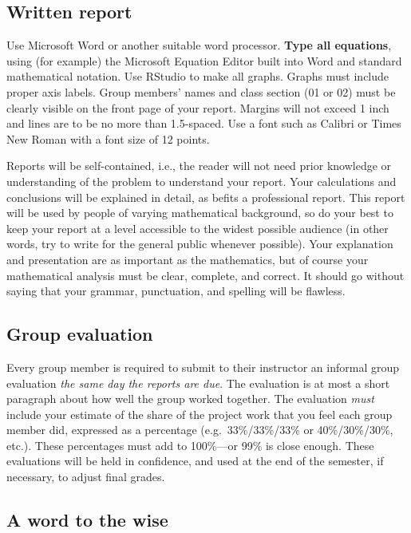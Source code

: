 \documentclass[11pt]{article}
\begin{document}
\subsection*{Written report}
\vspace{-2.8ex}

Use Microsoft Word or another suitable word processor. \textbf{Type all
equations}, using (for example) the Microsoft Equation Editor built into Word
and standard mathematical notation. Use RStudio to make all graphs. Graphs
must include proper axis labels. Group members' names and class section (01 or
02) must be clearly visible on the front page of your report. Margins will not
exceed 1 inch and lines are to be no more than 1.5-spaced. Use a font such as
Calibri or Times New Roman with a font size of 12 points.

Reports will be self-contained, i.e., the reader will not need prior knowledge
or understanding of the problem to understand your report. Your calculations
and conclusions will be explained in detail, as befits a professional report.
This report will be used by people of varying mathematical background, so do
your best to keep your report at a level accessible to the widest possible
audience (in other words, try to write for the general public whenever
possible). Your explanation and presentation are as important as the
mathematics, but of course your mathematical analysis must be clear, complete,
and correct. It should go without saying that your grammar, punctuation, and
spelling will be flawless.

\subsection*{Group evaluation}
\vspace{-2.8ex}

Every group member is required to submit to their instructor an informal group
evaluation \emph{the same day the reports are due}. The evaluation is at most
a short paragraph about how well the group worked together. The evaluation
\emph{must} include your estimate of the share of the project work that you
feel each group member did, expressed as a percentage (e.g.~33\%/33\%/33\% or
40\%/30\%/30\%, etc.). These percentages must add to 100\%---or 99\% is close
enough. These evaluations will be held in confidence, and used at the end of
the semester, if necessary, to adjust final grades.

\subsection*{A word to the wise}
\vspace{-2.8ex}
\end{document}
